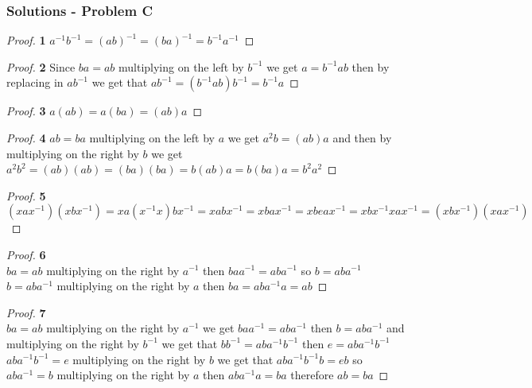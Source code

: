 \documentclass[11pt]{article}
\begin{document}
	\subsubsection*{Solutions - Problem C}
		\begin{proof}{\textbf{1}}
			$a^{-1}b^{-1}=(ab)^{-1}=(ba)^{-1}=b^{-1}a^{-1}$
		\end{proof}
		\begin{proof}{\textbf{2}}
			Since $ba=ab$ multiplying on the left by $b^{-1}$ we get $a=b^{-1}ab$ then by replacing in $ab^{-1}$ we get that $ab^{-1}=(b^{-1}ab)b^{-1}=b^{-1}a$
		\end{proof}
		\begin{proof}{\textbf{3}}
			$a(ab)=a(ba)=(ab)a$
		\end{proof}
		\begin{proof}{\textbf{4}}
			$ab=ba$ multiplying on the left by $a$ we get $a^2b=(ab)a$ and then by multiplying on the right by $b$ we get $a^2b^2=(ab)(ab)=(ba)(ba)=b(ab)a=b(ba)a=b^2a^2$
		\end{proof}
		\begin{proof}{\textbf{5}}
			$(xax^{-1})(xbx^{-1})=xa(x^{-1}x)bx^{-1}=xabx^{-1}=xbax^{-1}=xbeax^{-1}=xbx^{-1}xax^{-1}=(xbx^{-1})(xax^{-1})$
		\end{proof}
		\begin{proof}{\textbf{6}}\\
			$ba=ab $ multiplying on the right by $a^{-1}$ then $ baa^{-1}=aba^{-1}$ so $b=aba^{-1}$\\
			$b=aba^{-1}$ multiplying on the right by $a$ then $ba=aba^{-1}a=ab$
		\end{proof}
		\begin{proof}{\textbf{7}}\\
			$ba=ab$ multiplying on the right by $a^{-1}$ we get $baa^{-1}=aba^{-1}$ then $b=aba^{-1}$ and multiplying on the right by $b^{-1}$ we get that $bb^{-1}=aba^{-1}b^{-1}$ then $e=aba^{-1}b^{-1}$\\
			$aba^{-1}b^{-1}=e$ multiplying on the right by $b$ we get that $aba^{-1}b^{-1}b=eb$ so $aba^{-1}=b$ multiplying on the right by $a$ then $aba^{-1}a=ba$ therefore $ab=ba$
		\end{proof}
\end{document}
